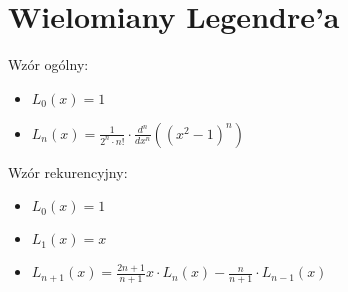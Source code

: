 \section*{Wielomiany Legendre'a}

Wzór ogólny:
\begin{itemize}
    \item $L_0(x) = 1$
    \item $L_n(x) = \frac{1}{2^n\cdot n!}\cdot\frac{d^n}{dx^n}
    \left(\left(x^2-1\right)^n\right)$
\end{itemize}

Wzór rekurencyjny:
\begin{itemize}
    \item $L_0(x) = 1$
    \item $L_1(x) = x$
    \item $L_{n+1}(x) = \frac{2n+1}{n+1} x \cdot
    L_n(x) - \frac{n}{n+1}\cdot L_{n-1}(x)$
\end{itemize}
